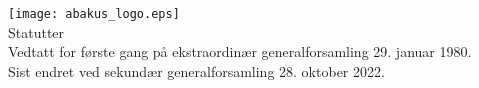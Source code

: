 \documentclass{article}
\begin{document}
\begin{center}
  \texttt{[image: abakus\_logo.eps]} \\
  \Large{Statutter} \\
  \vspace{0.4cm}
  \normalsize{Vedtatt for første gang på ekstraordinær generalforsamling 29. januar 1980. \\
              Sist endret ved sekundær generalforsamling 28. oktober 2022.}
\end{center}

\newpage
\tableofcontents
\newpage


\end{document}
